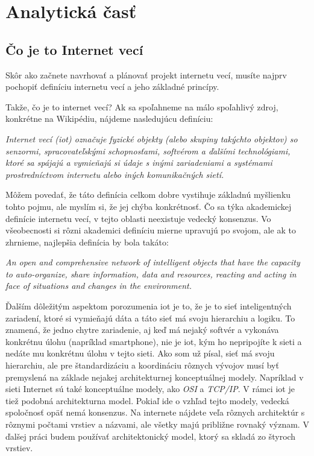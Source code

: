 
\chapter{Analytická časť}

\section{Čo je to Internet vecí}
Skôr ako začnete navrhovať a plánovať projekt internetu vecí, musíte najprv pochopiť definíciu internetu vecí a jeho základné princípy.

Takže, čo je to internet vecí? Ak sa spoľahneme na málo spoľahlivý zdroj, konkrétne na Wikipédiu, nájdeme nasledujúcu definíciu:

\textit{Internet vecí (\gls{iot}) označuje fyzické objekty (alebo skupiny takýchto objektov) so senzormi, spracovateľskými schopnosťami, softvérom a ďalšími technológiami, ktoré sa spájajú a vymieňajú si údaje s inými zariadeniami a systémami prostredníctvom internetu alebo iných komunikačných sietí.}\cite{wiki}

Môžem povedať, že táto definícia celkom dobre vystihuje základnú myšlienku tohto pojmu, ale myslím si, že jej chýba konkrétnosť. Čo sa týka akademickej definície internetu vecí, v tejto oblasti neexistuje vedecký konsenzus. Vo všeobecnosti si rôzni akademici definíciu mierne upravujú po svojom, ale ak to zhrnieme, najlepšia definícia by bola takáto:

\textit{An open and comprehensive network of intelligent objects that have the capacity to auto-organize, share information, data and resources, reacting and acting in face of situations and changes in the environment.}\cite{book}

Ďalším dôležitým aspektom porozumenia \gls{iot} je to, že je to sieť inteligentných zariadení, ktoré si vymieňajú dáta a táto sieť má svoju hierarchiu a logiku. To znamená, že jedno chytre zariadenie, aj keď má nejaký softvér a vykonáva konkrétnu úlohu (napríklad smartphone), nie je \gls{iot}, kým ho nepripojíte k sieti a nedáte mu konkrétnu úlohu v tejto sieti. Ako som už písal, sieť má svoju hierarchiu, ale pre štandardizáciu a koordináciu rôznych vývojov musí byť premyslená na základe nejakej architekturnej konceptuálnej modely. Napríklad v sieti Internet sú také konceptuálne modely, ako \textit{OSI} a \textit{TCP/IP}. V rámci \gls{iot} je tiež podobná architekturna model. Pokiaľ ide o vzhľad tejto modely, vedecká spoločnosť opäť nemá konsenzus. Na internete nájdete veľa rôznych architektúr s rôznymi počtami vrstiev a názvami, ale všetky majú približne rovnaký význam. V ďalšej práci budem používať architektonický model, ktorý sa skladá zo štyroch vrstiev.

